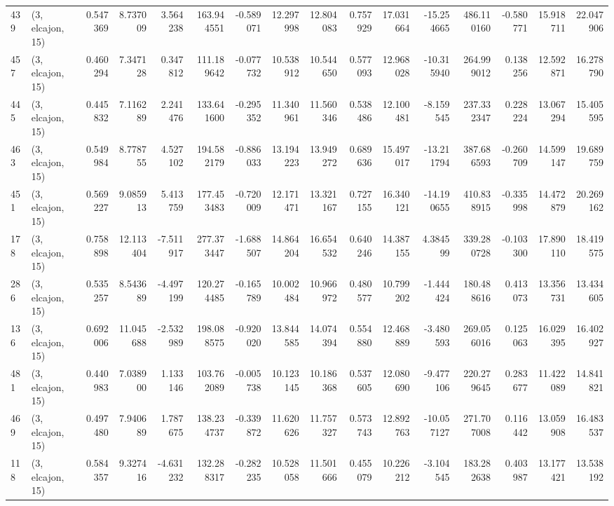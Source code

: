 \begin{tabular}{llrrrrrrrrrrrrrr}
439 &  (3, elcajon, 15) &   0.547369 &   8.737009 &   3.564238 &   163.944551 &  -0.589071 &  12.297998 &  12.804083 &  0.757929 &  17.031664 & -15.254665 &   486.110160 & -0.580771 &  15.918711 &  22.047906 \\
457 &  (3, elcajon, 15) &   0.460294 &   7.347128 &   0.347812 &   111.189642 &  -0.077732 &  10.538912 &  10.544650 &  0.577093 &  12.968028 & -10.315940 &   264.999012 &  0.138256 &  12.592871 &  16.278790 \\
445 &  (3, elcajon, 15) &   0.445832 &   7.116289 &   2.241476 &   133.641600 &  -0.295352 &  11.340961 &  11.560346 &  0.538486 &  12.100481 &  -8.159545 &   237.332347 &  0.228224 &  13.067294 &  15.405595 \\
463 &  (3, elcajon, 15) &   0.549984 &   8.778755 &   4.527102 &   194.582179 &  -0.886033 &  13.194223 &  13.949272 &  0.689636 &  15.497017 & -13.211794 &   387.686593 & -0.260709 &  14.599147 &  19.689759 \\
451 &  (3, elcajon, 15) &   0.569227 &   9.085913 &   5.413759 &   177.453483 &  -0.720009 &  12.171471 &  13.321167 &  0.727155 &  16.340121 & -14.190655 &   410.838915 & -0.335998 &  14.472879 &  20.269162 \\
178 &  (3, elcajon, 15) &   0.758898 &  12.113404 &  -7.511917 &   277.373447 &  -1.688507 &  14.864204 &  16.654532 &  0.640246 &  14.387155 &   4.384599 &   339.280728 & -0.103300 &  17.890110 &  18.419575 \\
286 &  (3, elcajon, 15) &   0.535257 &   8.543689 &  -4.497199 &   120.274485 &  -0.165789 &  10.002484 &  10.966972 &  0.480577 &  10.799202 &  -1.444424 &   180.488616 &  0.413073 &  13.356731 &  13.434605 \\
136 &  (3, elcajon, 15) &   0.692006 &  11.045688 &  -2.532989 &   198.088575 &  -0.920020 &  13.844585 &  14.074394 &  0.554880 &  12.468889 &  -3.480593 &   269.056016 &  0.125063 &  16.029395 &  16.402927 \\
481 &  (3, elcajon, 15) &   0.440983 &   7.038900 &   1.133146 &   103.762089 &  -0.005738 &  10.123145 &  10.186368 &  0.537605 &  12.080690 &  -9.477106 &   220.279645 &  0.283677 &  11.422089 &  14.841821 \\
469 &  (3, elcajon, 15) &   0.497480 &   7.940689 &   1.787675 &   138.234737 &  -0.339872 &  11.620626 &  11.757327 &  0.573743 &  12.892763 & -10.057127 &   271.707008 &  0.116442 &  13.059908 &  16.483537 \\
118 &  (3, elcajon, 15) &   0.584357 &   9.327416 &  -4.631232 &   132.288317 &  -0.282235 &  10.528058 &  11.501666 &  0.455079 &  10.226212 &  -3.104545 &   183.282638 &  0.403987 &  13.177421 &  13.538192 \\

\end{tabular}
